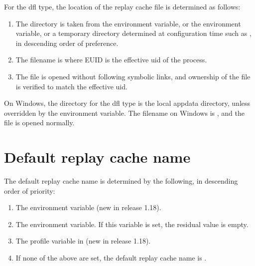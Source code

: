 \documentclass[letterpaper,10pt,english]{sphinxmanual}
\begin{document}
\sphinxAtStartPar
For the dfl type, the location of the replay cache file is determined
as follows:
\begin{enumerate}
%
\item {} 
\sphinxAtStartPar
The directory is taken from the  environment
variable, or the  environment variable, or a temporary
directory determined at configuration time such as , in
descending order of preference.

\item {} 
\sphinxAtStartPar
The filename is  where EUID is the effective
uid of the process.

\item {} 
\sphinxAtStartPar
The file is opened without following symbolic links, and ownership
of the file is verified to match the effective uid.

\end{enumerate}

\sphinxAtStartPar
On Windows, the directory for the dfl type is the local appdata
directory, unless overridden by the  environment
variable.  The filename on Windows is , and the file
is opened normally.


\section{Default replay cache name}
\label{\detokenize{basic/rcache_def:default-replay-cache-name}}
\sphinxAtStartPar
The default replay cache name is determined by the following, in
descending order of priority:
\begin{enumerate}
%
\item {} 
\sphinxAtStartPar
The  environment variable (new in release 1.18).

\item {} 
\sphinxAtStartPar
The  environment variable.  If this variable is
set, the residual value is empty.

\item {} 
\sphinxAtStartPar
The  profile variable in 
(new in release 1.18).

\item {} 
\sphinxAtStartPar
If none of the above are set, the default replay cache name is
.

\end{enumerate}
\end{document}
